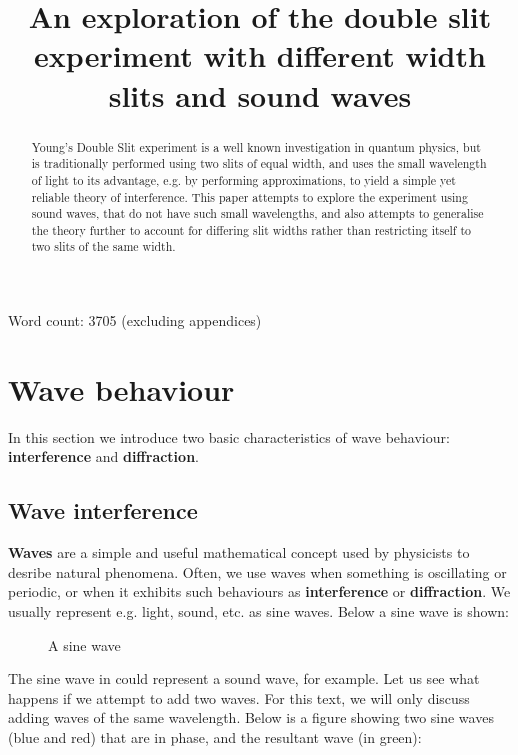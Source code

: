 \documentclass{paper}
\date{}
\title{An exploration of the double slit experiment with different width slits and sound waves}
\begin{document}
 
\maketitle
\begin{abstract}
    Young's Double Slit experiment is a well known investigation
    in quantum physics, but is traditionally performed using two
    slits of equal width, and uses the small wavelength of light
    to its advantage, e.g. by performing approximations, to yield
    a simple yet reliable theory of interference. This paper 
    attempts to explore the experiment using sound waves,
    that do not have such small wavelengths, and also attempts to 
    generalise the theory further to account for differing slit widths
    rather than restricting itself to two slits of the same width.
\end{abstract}

Word count: 3705 (excluding appendices)

\pagebreak
\tableofcontents
\pagebreak
\section{Wave behaviour}
In this section we introduce two basic characteristics of wave behaviour: \textbf{interference} and \textbf{diffraction}. 
\subsection{Wave interference}
\textbf{Waves} are a simple and useful mathematical concept used by physicists to desribe natural phenomena. Often, we use waves when something is oscillating or periodic, or when it exhibits such behaviours as \textbf{interference} or \textbf{diffraction}. We usually represent e.g. light, sound, etc. as sine waves. Below a sine wave is shown:

\begin{figure}[H]
\caption{A sine wave}
\label{fig:sine-wave}
\end{figure}

The sine wave in  could represent a sound wave, for example. Let us see what happens if we attempt to add two waves. For this text, we will only discuss adding waves of the same wavelength. Below is a figure showing two sine waves (blue and red) that are in phase, and the resultant wave (in green):
\end{document}
